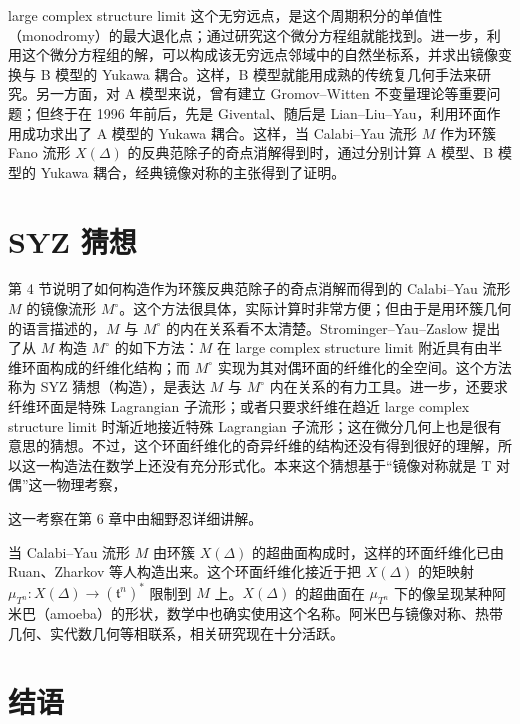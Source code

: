 large complex structure limit 这个无穷远点，是这个周期积分的单值性（monodromy）的最大退化点；通过研究这个微分方程组就能找到。进一步，利用这个微分方程组的解，可以构成该无穷远点邻域中的自然坐标系，并求出镜像变换与 B 模型的 Yukawa 耦合。这样，B 模型就能用成熟的传统复几何手法来研究。另一方面，对 A 模型来说，曾有建立 Gromov--Witten 不变量理论等重要问题；但终于在 1996 年前后，先是 Givental、随后是 Lian--Liu--Yau，利用环面作用成功求出了 A 模型的 Yukawa 耦合。这样，当 Calabi--Yau 流形 $M$ 作为环簇 Fano 流形 $X(\Delta)$ 的反典范除子的奇点消解得到时，通过分别计算 A 模型、B 模型的 Yukawa 耦合，经典镜像对称的主张得到了证明。

\section{SYZ 猜想}

第 4 节说明了如何构造作为环簇反典范除子的奇点消解而得到的 Calabi--Yau 流形 $M$ 的镜像流形 $M^\circ$。这个方法很具体，实际计算时非常方便；但由于是用环簇几何的语言描述的，$M$ 与 $M^\circ$ 的内在关系看不太清楚。Strominger--Yau--Zaslow 提出了从 $M$ 构造 $M^\circ$ 的如下方法：$M$ 在 large complex structure limit 附近具有由半维环面构成的纤维化结构；而 $M^\circ$ 实现为其对偶环面的纤维化的全空间。这个方法称为 SYZ 猜想（构造），是表达 $M$ 与 $M^\circ$ 内在关系的有力工具。进一步，还要求纤维环面是特殊 Lagrangian 子流形；或者只要求纤维在趋近 large complex structure limit 时渐近地接近特殊 Lagrangian 子流形；这在微分几何上也是很有意思的猜想。不过，这个环面纤维化的奇异纤维的结构还没有得到很好的理解，所以这一构造法在数学上还没有充分形式化。本来这个猜想基于“镜像对称就是 T 对偶”这一物理考察，

这一考察在第 6 章中由細野忍详细讲解。

当 Calabi--Yau 流形 $M$ 由环簇 $X(\Delta)$ 的超曲面构成时，这样的环面纤维化已由 Ruan、Zharkov 等人构造出来。这个环面纤维化接近于把 $X(\Delta)$ 的矩映射 $\mu_{T^n}\colon X(\Delta)\to(\mathfrak{t}^n)^*$ 限制到 $M$ 上。$X(\Delta)$ 的超曲面在 $\mu_{T^n}$ 下的像呈现某种阿米巴（amoeba）的形状，数学中也确实使用这个名称。阿米巴与镜像对称、热带几何、实代数几何等相联系，相关研究现在十分活跃。

\section{结语}

